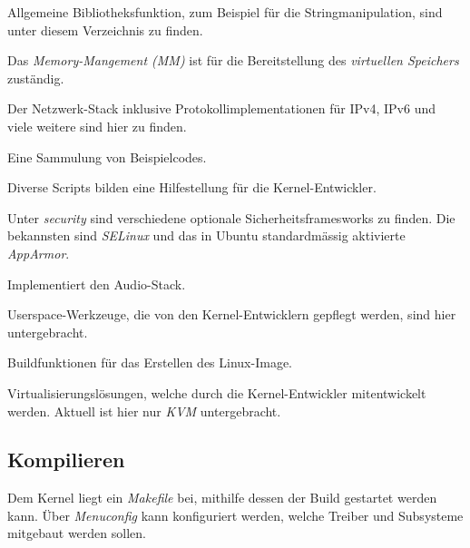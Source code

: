 \begin{description}[leftmargin=3cm]

   \item[lib]
      Allgemeine Bibliotheksfunktion, zum Beispiel für die Stringmanipulation, sind unter diesem Verzeichnis zu finden.

   \item[mm]
      Das \emph{Memory-Mangement (MM)} ist für die Bereitstellung des \emph{virtuellen Speichers} zuständig.


   \item[net]
      Der Netzwerk-Stack inklusive Protokollimplementationen für IPv4, IPv6 und viele weitere sind hier zu finden.

   \item[samples]
      Eine Sammulung von Beispielcodes.

   \item[scripts]
      Diverse Scripts bilden eine Hilfestellung für die Kernel-Entwickler. 

   \item[security]
      Unter \emph{security} sind verschiedene optionale Sicherheitsframesworks zu finden. Die bekannsten sind \emph{SELinux}
      und das in Ubuntu standardmässig aktivierte \emph{AppArmor}.

   \item[sound]
      Implementiert den Audio-Stack.

   \item[tools]
      Userspace-Werkzeuge, die von den Kernel-Entwicklern gepflegt werden, sind hier untergebracht.

   \item[usr]
      Buildfunktionen für das Erstellen des Linux-Image.

   \item[virt]
      Virtualisierungslösungen, welche durch die Kernel-Entwickler mitentwickelt werden. Aktuell ist hier nur \emph{KVM} untergebracht.
\end{description}


\subsection{Kompilieren}

Dem Kernel liegt ein \emph{Makefile} bei, mithilfe dessen der Build gestartet werden kann.
Über \emph{Menuconfig} kann konfiguriert werden, welche Treiber und Subsysteme
mitgebaut werden sollen.

